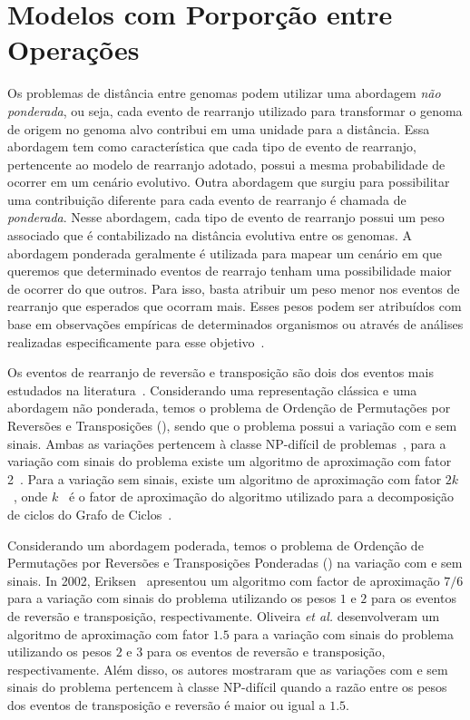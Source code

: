 \chapter{Modelos com Porporção entre Operações}

Os problemas de distância entre genomas podem utilizar uma abordagem \emph{não ponderada}, ou seja, cada evento de rearranjo utilizado para transformar o genoma de origem no genoma alvo contribui em uma unidade para a distância. Essa abordagem tem como característica que cada tipo de evento de rearranjo, pertencente ao modelo de rearranjo adotado, possui a mesma probabilidade de ocorrer em um cenário evolutivo. Outra abordagem que surgiu para possibilitar uma contribuição diferente para cada evento de rearranjo é chamada de \emph{ponderada}. Nesse abordagem, cada tipo de evento de rearranjo possui um peso associado que é contabilizado na distância evolutiva entre os genomas. A abordagem ponderada geralmente é utilizada para mapear um cenário em que queremos que determinado eventos de rearrajo tenham uma possibilidade maior de ocorrer do que outros. Para isso, basta atribuir um peso menor nos eventos de rearranjo que esperados que ocorram mais. Esses pesos podem ser atribuídos com base em observações empíricas de determinados organismos ou através de análises realizadas especificamente para esse objetivo~\cite{2008-bader-etal,2001-eriksen}. 

Os eventos de rearranjo de reversão e transposição são dois dos eventos mais estudados na literatura~\cite{2002-berman-etal,2006-elias-hartman,2022-silva-etal}. Considerando uma representação clássica e uma abordagem não ponderada, temos o problema de Ordenção de Permutações por Reversões e Transposições (\SbRT), sendo que o problema possui a variação com e sem sinais. Ambas as variações pertencem à classe NP-difícil de problemas~\cite{2019b-oliveira-etal}, para a variação com sinais do problema existe um algoritmo de aproximação com fator 2~\cite{1998-walter-etal}. Para a variação sem sinais, existe um algoritmo de aproximação com fator $2k$~\cite{2008-rahman-etal}, onde $k$~\cite{2013-chen} é o fator de aproximação do algoritmo utilizado para a decomposição de ciclos do Grafo de Ciclos~\cite{1999-caprara}.

Considerando um abordagem poderada, temos o problema de Ordenção de Permutações por Reversões e Transposições Ponderadas (\SbWRT) na variação com e sem sinais. In 2002, Eriksen~\cite{2002-eriksen} apresentou um algoritmo com factor de aproximação $7/6$ para a variação com sinais do problema utilizando os pesos $1$ e $2$ para os eventos de reversão e transposição, respectivamente. Oliveira \textit{et al.}\cite{2019a-oliveira-etal} desenvolveram um algoritmo de aproximação com fator $1.5$ para a variação com sinais do problema \SbWRT{} utilizando os pesos $2$ e $3$ para os eventos de reversão e transposição, respectivamente. Além disso, os autores mostraram que as variações com e sem sinais do problema \SbWRT{} pertencem à classe NP-difícil quando a razão entre os pesos dos eventos de transposição e reversão é maior ou igual a $1.5$.  

